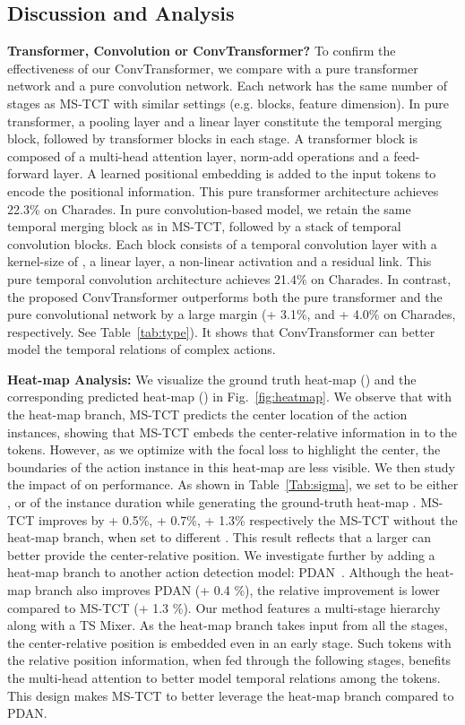 \documentclass[10pt,twocolumn,letterpaper]{article}
\begin{document}
\subsection{Discussion and Analysis}

\noindent \textbf{Transformer, Convolution or ConvTransformer?}
To confirm the effectiveness of our ConvTransformer, we compare with a pure transformer network and a pure convolution network. Each network has the same number of stages as MS-TCT with similar settings (e.g. blocks, feature dimension).
In pure transformer, a pooling layer and a linear layer constitute the temporal merging block, followed by  transformer blocks in each stage. A transformer block is composed of a multi-head attention layer, norm-add operations and a feed-forward layer. A learned positional embedding is added to the input tokens to encode the positional information. This pure transformer architecture achieves 22.3\% on Charades.
In pure convolution-based model, we retain the same temporal merging block as in MS-TCT, followed by a stack of  temporal convolution blocks. Each block consists of a temporal convolution layer with a kernel-size of , a linear layer, a non-linear activation and a residual link. This pure temporal convolution architecture achieves 21.4\% on Charades.  
In contrast, the proposed ConvTransformer outperforms both the pure transformer and the pure convolutional network by a large margin (+ 3.1\%, and + 4.0\% on Charades, respectively. See Table~\ref{tab:type}).
It shows that ConvTransformer can better model the temporal relations of complex actions. 

\noindent\textbf{Heat-map Analysis:} We visualize the ground truth heat-map () and the corresponding predicted heat-map () in Fig.~\ref{fig:heatmap}. We observe that with the heat-map branch, MS-TCT predicts the center location of the action instances, showing that MS-TCT embeds the center-relative information in to the tokens. However, as we optimize with the focal loss to highlight the center, the boundaries of the action instance in this heat-map are less visible. 
We then study the impact of  on performance. As shown in Table~\ref{Tab:sigma}, we set  to be either ,  or  of the instance duration while generating the ground-truth heat-map . MS-TCT improves by + 0.5\%, + 0.7\%, + 1.3\% respectively \wrt the MS-TCT without the heat-map branch, when  set to different . This result reflects that a larger  can better provide the center-relative position. 
We investigate further by adding a heat-map branch to another action detection model: PDAN~\cite{Dai_2021_WACV}. Although the heat-map branch also improves PDAN (+ 0.4 \%), the relative improvement is lower compared to MS-TCT (+ 1.3 \%).
Our method features a multi-stage hierarchy along with a TS Mixer. As the heat-map branch takes input from all the stages, the center-relative position is embedded even in an early stage. Such tokens with the relative position information, when fed through the following stages, benefits the multi-head attention to better model temporal relations among the tokens. This design makes MS-TCT to better leverage the heat-map branch compared to PDAN. 
\end{document}
